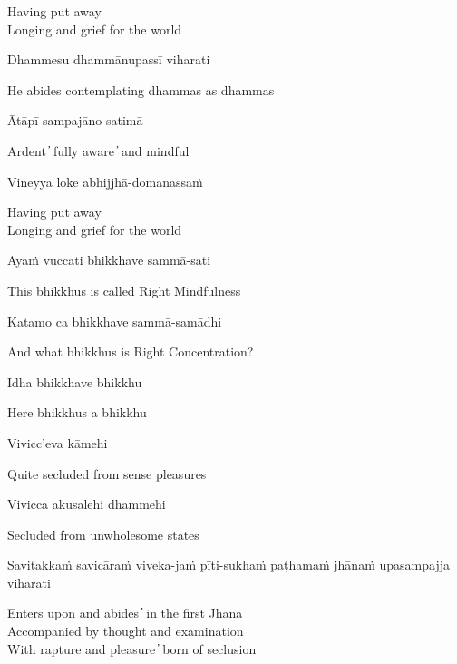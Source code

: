 \begin{cprenglish}
  Having put away\\
  Longing and grief for the world
\end{cprenglish}

Dhammesu dhammānupassī viharati

\begin{cprenglish}
  He abides contemplating dhammas as dhammas
\end{cprenglish}

Ātāpī sampajāno satimā

\begin{cprenglish}
  Ardent  ̓  fully aware  ̓  and mindful
\end{cprenglish}

Vineyya loke abhijjhā-domanassaṁ

\begin{cprenglish}
  Having put away\\
  Longing and grief for the world
\end{cprenglish}

Ayaṁ vuccati bhikkhave sammā-sati

\begin{cprenglish}
  This bhikkhus is called Right Mindfulness
\end{cprenglish}

Katamo ca bhikkhave sammā-samādhi

\begin{cprenglish}
  And what bhikkhus is Right Concentration?
\end{cprenglish}

Idha bhikkhave bhikkhu

\begin{cprenglish}
  Here bhikkhus a bhikkhu
\end{cprenglish}

Vivicc’eva kāmehi

\begin{cprenglish}
  Quite secluded from sense pleasures
\end{cprenglish}

Vivicca akusalehi dhammehi

\begin{cprenglish}
  Secluded from unwholesome states
\end{cprenglish}

Savitakkaṁ savicāraṁ viveka-jaṁ pīti-sukhaṁ paṭhamaṁ jhānaṁ upasampajja viharati

\begin{cprenglish}
  Enters upon and abides  ̓  in the first Jhāna\\
  Accompanied by thought and examination\\
  With rapture and pleasure  ̓  born of seclusion
\end{cprenglish}

